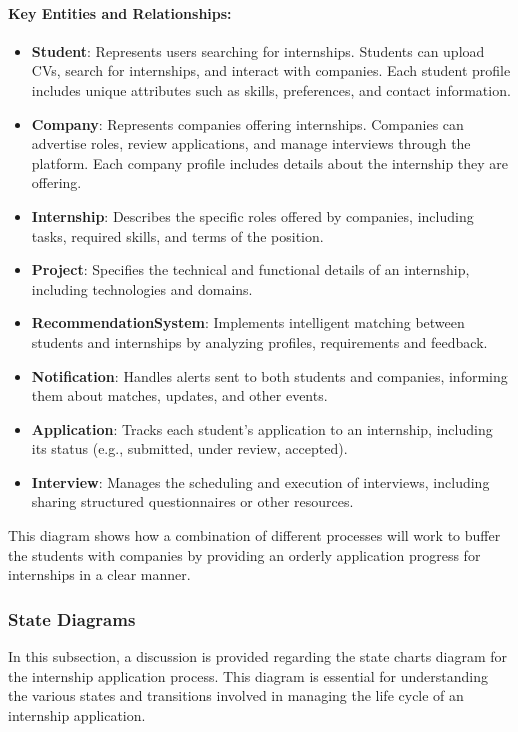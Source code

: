 \documentclass[12pt]{article}
\numberwithin{figure}{section}
\numberwithin{table}{section}
\begin{document}
\paragraph{Key Entities and Relationships:}
\begin{itemize}
    \item \textbf{Student}: Represents users searching for internships. Students can upload CVs, search for internships, and interact with companies. Each student profile includes unique attributes such as skills, preferences, and contact information.
    \item \textbf{Company}: Represents companies offering internships. Companies can advertise roles, review applications, and manage interviews through the platform. Each company profile includes details about the internship they are offering.
    \item \textbf{Internship}: Describes the specific roles offered by companies, including tasks, required skills, and terms of the position.
    \item \textbf{Project}: Specifies the technical and functional details of an internship, including technologies and domains.
    \item \textbf{RecommendationSystem}: Implements intelligent matching between students and internships by analyzing profiles, requirements and feedback.
    \item \textbf{Notification}: Handles alerts sent to both students and companies, informing them about matches, updates, and other events.
    \item \textbf{Application}: Tracks each student’s application to an internship, including its status (e.g., submitted, under review, accepted).
    \item \textbf{Interview}: Manages the scheduling and execution of interviews, including sharing structured questionnaires or other resources.
\end{itemize}

This diagram shows how a combination of different processes will work to buffer the students with companies by providing an orderly application progress for internships in a clear manner.


\newpage

\subsubsection{State Diagrams}

In this subsection, a discussion is provided regarding the state charts diagram for the internship application process. This diagram is essential for understanding the various states and transitions involved in managing the life cycle of an internship application.
\end{document}
